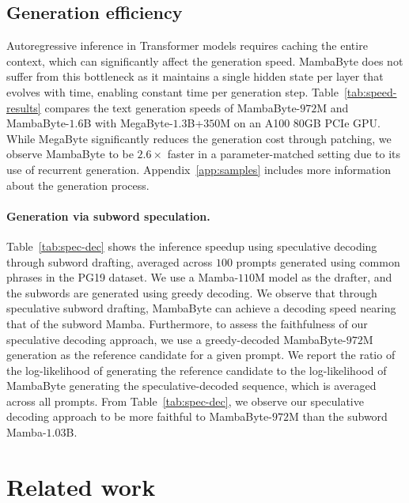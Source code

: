 \subsection{Generation efficiency}
\label{sec:6.3}

Autoregressive inference in Transformer models requires caching the entire context, which can significantly affect the generation speed. MambaByte does not suffer from this bottleneck as it maintains a single hidden state per layer that evolves with time, enabling constant time per generation step. Table~\ref{tab:speed-results} compares the text generation speeds of MambaByte-$972$M and MambaByte-$1.6$B with MegaByte-$1.3$B+$350$M on an A100 80GB PCIe GPU. While MegaByte significantly reduces the generation cost through patching, we observe MambaByte to be $2.6\times$ faster in a parameter-matched setting due to its use of recurrent generation. Appendix~\ref{app:samples} includes more information about the generation process.

\paragraph{Generation via subword speculation.} Table~\ref{tab:spec-dec} shows the inference speedup using speculative decoding through subword drafting, averaged across $100$ prompts generated using common phrases in the PG19 dataset. We use a Mamba-$110$M model as the drafter, and the subwords are generated using greedy decoding. We observe that through speculative subword drafting, MambaByte can achieve a decoding speed nearing that of the subword Mamba. Furthermore, to assess the faithfulness of our speculative decoding approach, we use a greedy-decoded MambaByte-$972$M generation as the reference candidate for a given prompt. We report the ratio of the log-likelihood of generating the reference candidate to the log-likelihood of MambaByte generating the speculative-decoded sequence, which is averaged across all prompts. From Table~\ref{tab:spec-dec}, we observe our speculative decoding approach to be more faithful to MambaByte-$972$M than the subword Mamba-$1.03$B. 

\section{Related work}
\label{sec:rel}

